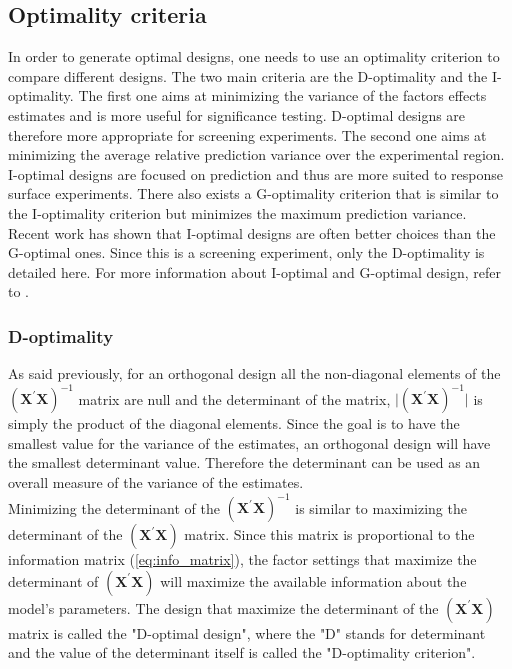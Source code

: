 \subsection{Optimality criteria}
In order to generate optimal designs, one needs to use an optimality criterion to compare different designs. The two main criteria are the D-optimality and the I-optimality. The first one aims at minimizing the variance of the factors effects estimates and is more useful for significance testing. D-optimal designs are therefore more appropriate for screening experiments. The second one aims at minimizing the average relative prediction variance over the experimental region. I-optimal designs are focused on prediction and thus are more suited to response surface experiments.
There also exists a G-optimality criterion that is similar to the I-optimality criterion but minimizes the maximum prediction variance. Recent work \parencite{rodriguez2010generating} has shown that I-optimal designs are often better choices than the G-optimal ones. Since this is a screening experiment, only the D-optimality is detailed here. For more information about I-optimal and G-optimal design, refer to \textcite{goos2011optimal,atkinson2014optimal}.

\subsubsection{D-optimality}
As said previously, for an orthogonal design all the non-diagonal elements of the $(\mathbf{X}^{\prime}\mathbf{X})^{-1}$ matrix are null and the determinant of the matrix, $\vert(\mathbf{X}^{\prime}\mathbf{X})^{-1}\vert$ is simply the product of the diagonal elements. Since the goal is to have the smallest value for the variance of the estimates, an orthogonal design will have the smallest determinant value. Therefore the determinant can be used as an overall measure of the variance of the estimates.\\
Minimizing the determinant of the $(\mathbf{X}^{\prime}\mathbf{X})^{-1}$ is similar to maximizing the determinant of the $(\mathbf{X}^{\prime}\mathbf{X})$ matrix. Since this matrix is proportional to the information matrix (\ref{eq:info_matrix}), the factor settings that maximize the determinant of $(\mathbf{X}^{\prime}\mathbf{X})$ will maximize the available information about the model's parameters. The design that maximize the determinant of the $(\mathbf{X}^{\prime}\mathbf{X})$ matrix is called the "D-optimal design", where the "D" stands for determinant and the value of the determinant itself is called the "D-optimality criterion".\\


